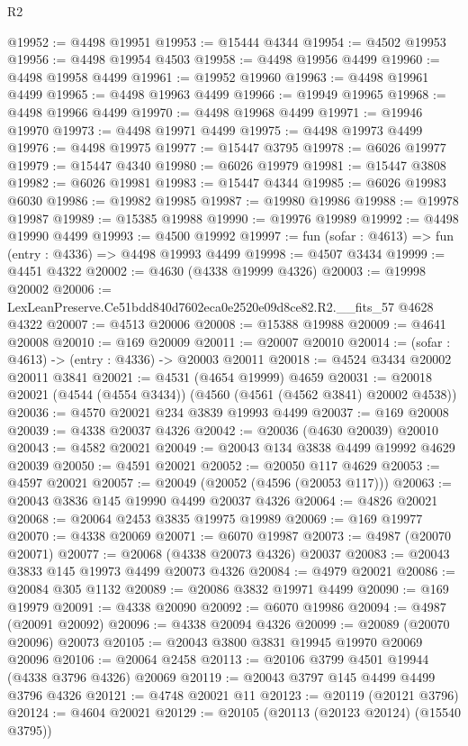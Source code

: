 \begin{lexlean}{R2}
\begin{coremodule}
@19952 := @4498 @19951
@19953 := @15444 @4344
@19954 := @4502 @19953
@19956 := @4498 @19954 @4503
@19958 := @4498 @19956 @4499
@19960 := @4498 @19958 @4499
@19961 := @19952 @19960
@19963 := @4498 @19961 @4499
@19965 := @4498 @19963 @4499
@19966 := @19949 @19965
@19968 := @4498 @19966 @4499
@19970 := @4498 @19968 @4499
@19971 := @19946 @19970
@19973 := @4498 @19971 @4499
@19975 := @4498 @19973 @4499
@19976 := @4498 @19975
@19977 := @15447 @3795
@19978 := @6026 @19977
@19979 := @15447 @4340
@19980 := @6026 @19979
@19981 := @15447 @3808
@19982 := @6026 @19981
@19983 := @15447 @4344
@19985 := @6026 @19983 @6030
@19986 := @19982 @19985
@19987 := @19980 @19986
@19988 := @19978 @19987
@19989 := @15385 @19988
@19990 := @19976 @19989
@19992 := @4498 @19990 @4499
@19993 := @4500 @19992
@19997 := fun (sofar : @4613) => fun (entry : @4336) => @4498 @19993 @4499
@19998 := @4507 @3434
@19999 := @4451 @4322
@20002 := @4630 (@4338 @19999 @4326)
@20003 := @19998 @20002
@20006 := LexLeanPreserve.Ce51bdd840d7602eca0e2520e09d8ce82.R2.__fits_57 @4628 @4322
@20007 := @4513 @20006
@20008 := @15388 @19988
@20009 := @4641 @20008
@20010 := @169 @20009
@20011 := @20007 @20010
@20014 := (sofar : @4613) -> (entry : @4336) -> @20003 @20011
@20018 := @4524 @3434 @20002 @20011 @3841
@20021 := @4531 (@4654 @19999) @4659
@20031 := @20018 @20021 (@4544 (@4554 @3434)) (@4560 (@4561 (@4562 @3841) @20002 @4538))
@20036 := @4570 @20021 @234 @3839 @19993 @4499
@20037 := @169 @20008
@20039 := @4338 @20037 @4326
@20042 := @20036 (@4630 @20039) @20010
@20043 := @4582 @20021
@20049 := @20043 @134 @3838 @4499 @19992 @4629 @20039
@20050 := @4591 @20021
@20052 := @20050 @117 @4629
@20053 := @4597 @20021
@20057 := @20049 (@20052 (@4596 (@20053 @117)))
@20063 := @20043 @3836 @145 @19990 @4499 @20037 @4326
@20064 := @4826 @20021
@20068 := @20064 @2453 @3835 @19975 @19989
@20069 := @169 @19977
@20070 := @4338 @20069
@20071 := @6070 @19987
@20073 := @4987 (@20070 @20071)
@20077 := @20068 (@4338 @20073 @4326) @20037
@20083 := @20043 @3833 @145 @19973 @4499 @20073 @4326
@20084 := @4979 @20021
@20086 := @20084 @305 @1132
@20089 := @20086 @3832 @19971 @4499
@20090 := @169 @19979
@20091 := @4338 @20090
@20092 := @6070 @19986
@20094 := @4987 (@20091 @20092)
@20096 := @4338 @20094 @4326
@20099 := @20089 (@20070 @20096) @20073
@20105 := @20043 @3800 @3831 @19945 @19970 @20069 @20096
@20106 := @20064 @2458
@20113 := @20106 @3799 @4501 @19944 (@4338 @3796 @4326) @20069
@20119 := @20043 @3797 @145 @4499 @4499 @3796 @4326
@20121 := @4748 @20021 @11
@20123 := @20119 (@20121 @3796)
@20124 := @4604 @20021
@20129 := @20105 (@20113 (@20123 @20124) (@15540 @3795))

\end{coremodule}
\end{lexlean}
